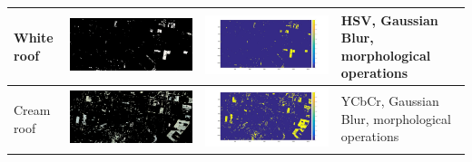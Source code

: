 \documentclass[fleqn,10pt]{SelfArx} %
\begin{document}
\begin{table}
\begin{tabular}{>{\centering\arraybackslash}M{8mm}cc>{\centering\arraybackslash}M{20mm}}
\midrule 
\vspace{-3cm}
\hspace{-0.4cm}
White roof & \includegraphics[clip,scale=0.07]{22rgb.jpg} & \includegraphics[trim={6cm 2.5cm 4.5cm 1.6cm},clip,scale=0.18]{22.jpg} & \vspace{-3cm}HSV, Gaussian Blur, morphological operations \\  
\midrule 
\vspace{-3cm}
\hspace{-0.4cm}
Cream roof & \includegraphics[clip,scale=0.07]{23rgb.jpg} & \includegraphics[trim={6cm 2.5cm 4.5cm 1.6cm},clip,scale=0.18]{23.jpg} & \vspace{-3cm}YCbCr, Gaussian Blur, morphological operations \\ 

\end{tabular}
\end{table}
\end{document}
